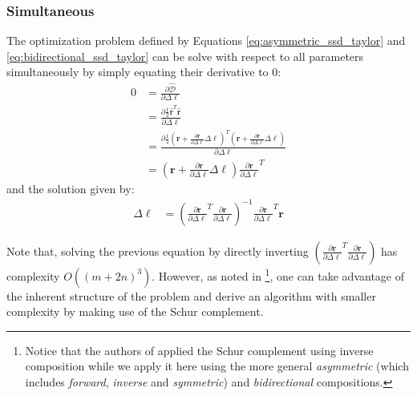 \subsubsection*{Simultaneous}
\label{sec:gauss_newton_simultaneous}

The optimization problem defined by Equations \ref{eq:asymmetric_ssd_taylor}  and \ref{eq:bidirectional_ssd_taylor} can be solve with respect to all parameters simultaneously by simply equating their derivative to $0$:
\begin{equation}
    \begin{aligned}
		0 & = \frac{\partial\hat{\mathcal{D}}}{\partial \Delta \boldsymbol{\ell}}
		\\
		& = \frac{\partial\frac{1}{2}\hat{\mathbf{r}}^T \hat{\mathbf{r}}}{\partial \Delta \boldsymbol{\ell}}
		\\
		& = \frac{\partial\frac{1}{2}(\mathbf{r} + \frac{\partial \mathbf{r}}{\partial \Delta \boldsymbol{\ell}} \Delta \boldsymbol{\ell})^T(\mathbf{r} + \frac{\partial \mathbf{r}}{\partial \Delta \boldsymbol{\ell}} \Delta \boldsymbol{\ell})}{\partial \Delta \boldsymbol{\ell}}
		\\
		& = \left( \mathbf{r} + \frac{\partial \mathbf{r}}{\partial \Delta \boldsymbol{\ell}} \Delta \boldsymbol{\ell} \right) \frac{\partial \mathbf{r}}{\partial \Delta \boldsymbol{\ell}}^T
    \label{eq:ssd_bc}
    \end{aligned}
\end{equation}
and the solution given by:
\begin{equation}
    \begin{aligned}
		\Delta \boldsymbol{\ell} & =  \left( \frac{\partial \mathbf{r}}{\partial \Delta \boldsymbol{\ell}}^T \frac{\partial \mathbf{r}}{\partial \Delta \boldsymbol{\ell}} \right)^{-1} \frac{\partial \mathbf{r}}{\partial \Delta \boldsymbol{\ell}}^T \mathbf{r}
    \label{eq:sim_solution}
    \end{aligned}
\end{equation}

Note that, solving the previous equation by directly inverting $\left( \frac{\partial \mathbf{r}}{\partial \Delta \boldsymbol{\ell}}^T \frac{\partial \mathbf{r}}{\partial \Delta \boldsymbol{\ell}} \right)$ has complexity $O((m + 2n)^3)$. However, as noted in \cite{Papandreou2008}\footnote{Notice that the authors of \cite{Papandreou2008} applied the Schur complement using inverse composition while we apply it here using the more general \emph{asymmetric} (which includes \emph{forward}, \emph{inverse} and \emph{symmetric}) and \emph{bidirectional} compositions.}, one can take advantage of the inherent structure of the problem and derive an algorithm with smaller complexity by making use of the Schur complement. 

